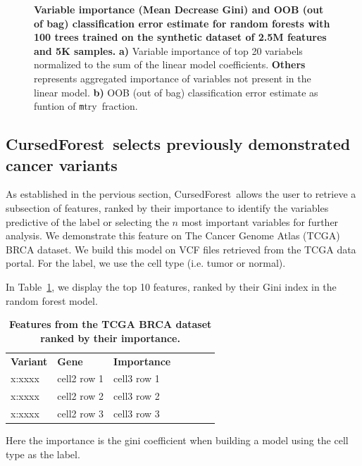 \documentclass[10pt,letterpaper]{article}
\newlength\savedwidth
\newcommand\thickhline{\noalign{\global\savedwidth\arrayrulewidth\global\arrayrulewidth 2pt}%
\hline
\noalign{\global\arrayrulewidth\savedwidth}}
\newcommand{\cursedforest}{{\sc CursedForest}}
\newcommand{\mtry}{{\texttt mtry}}
\begin{document}
\begin{figure}[tbph]
\begin{adjustwidth}{-1.00in}{0in}
\begin{tabular}{ll}
\end{tabular}
\caption{{\bf Variable importance (Mean Decrease Gini) and OOB (out of bag) classification error estimate for
  random forests with 100 trees trained on the synthetic dataset of 2.5M features and 5K samples.}  {\bf a)} Variable
  importance of top 20 variabels normalized to the sum of the linear model coefficients. {\bf Others} represents
  aggregated importance of variables not present in the linear model.  {\bf b)} OOB (out of bag) classification error
  estimate as funtion of \mtry\ fraction.}
\label{figure:synth}
\end{adjustwidth}
\end{figure}


\subsection{\cursedforest\ selects previously demonstrated cancer variants}
As established in the pervious section, \cursedforest\ allows the user to retrieve a subsection of features, ranked by
their importance to identify the variables predictive of the label or selecting the $n$ most important variables for
further analysis.  We demonstrate this feature on The Cancer Genome Atlas (TCGA) BRCA dataset.  We build this model on
VCF files retrieved from the TCGA data portal.  For the label, we use the cell type (i.e. tumor or normal).

In Table~\ref{table3}, we display the top 10 features, ranked by their Gini index in the random forest model.

\begin{table}[!ht]
\centering
\caption{
{\bf Features from the TCGA BRCA dataset ranked by their importance.}}
\begin{tabular}{|l|l|l|l|l|l|l|}
\hline
{\bf Variant} & {\bf Gene} & {\bf Importance}\\ \thickhline
x:xxxx & cell2 row 1 & cell3 row 1\\ \hline
x:xxxx & cell2 row 2 & cell3 row 2\\ \hline
x:xxxx & cell2 row 3 & cell3 row 3\\ \hline
\end{tabular}
\begin{flushleft} Here the importance is the gini coefficient when building a model using the cell type as the label.
\end{flushleft}
\label{table3}
\end{table}
\end{document}
